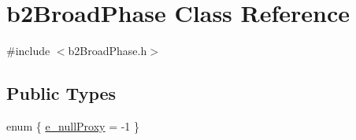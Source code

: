 \hypertarget{classb2_broad_phase}{}\section{b2\+Broad\+Phase Class Reference}
\label{classb2_broad_phase}


{\ttfamily \#include $<$b2\+Broad\+Phase.\+h$>$}

\subsection*{Public Types}
\begin{DoxyCompactItemize}
\item 
enum \{ \mbox{\hyperlink{classb2_broad_phase_ad14dca932793724b27024e60a6ade466a8a4f9965a5b0bbb13a35c20a37fef0ad}{e\+\_\+null\+Proxy}} = -\/1
 \}
\end{DoxyCompactItemize}
